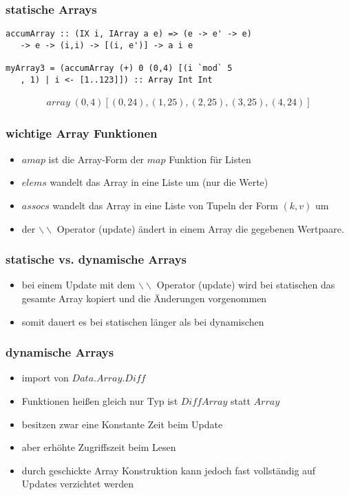 \begin{frame}[fragile]
\frametitle{statische Arrays}
\begin{lstlisting}
accumArray :: (IX i, IArray a e) => (e -> e' -> e) 
   -> e -> (i,i) -> [(i, e')] -> a i e

myArray3 = (accumArray (+) 0 (0,4) [(i `mod` 5
   , 1) | i <- [1..123]]) :: Array Int Int
\end{lstlisting}	
\pause
\begin{align*}
array\; (0,4) [(0,24),(1,25),(2,25),(3,25),(4,24)]
\end{align*}
\end{frame}

\begin{frame}
\frametitle{wichtige Array Funktionen}
\begin{itemize}
\item $amap$ ist die Array-Form der $map$ Funktion für Listen
\item $elems$ wandelt das Array in eine Liste um (nur die Werte)
\item $assocs$ wandelt das Array in eine Liste von Tupeln der Form $(k, v)$ um
\item der $\backslash\backslash$ Operator (update) ändert in einem Array die gegebenen Wertpaare.
\end{itemize}
\end{frame}

\begin{frame}
\frametitle{statische vs. dynamische Arrays}
\begin{itemize}
\item bei einem Update mit dem $\backslash\backslash$ Operator (update) wird bei statischen das gesamte Array kopiert und die Änderungen vorgenommen
\item somit dauert es bei statischen länger als bei dynamischen
\end{itemize}
\end{frame}

\begin{frame}
\frametitle{dynamische Arrays}
\begin{itemize}
\item import von $Data.Array.Diff$
\item Funktionen heißen gleich nur Typ ist $DiffArray$ statt $Array$
\item besitzen zwar eine Konstante Zeit beim Update
\item aber erhöhte Zugriffszeit beim Lesen
\item durch geschickte Array Konstruktion kann jedoch fast vollständig auf Updates verzichtet werden
\end{itemize}
\end{frame}

